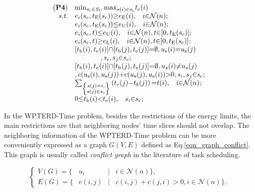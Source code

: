 \documentclass[journal,10pt]{IEEEtran}
\begin{document}
\begin{equation}
\label{eqn_wpterd_time}
\begin{array}{rl}
(\textbf{P4})&\mathop{\min}_{s_\text{c}{\in}S_\text{C}}{\max}_{s(i){\in}s_\text{c}}t_\text{e}(i)\\
\textit{s.t.}&e_i(s_\text{c},t_\text{E}(s_\text{c})){\geq}e_\text{E}(i),\hspace{3mm}i{\in}\mathcal{N}(n);\\
&e_i(s_\text{c},t_\text{E}(s_\text{c})){\leq}e_\text{U}(i),\hspace{3mm}i{\in}\mathcal{N}(n);\\
&e_i(s_\text{c},t){\leq}e_\text{U}(i),\hspace{3mm}i{\in}\mathcal{N}(n),t{\in}[0,t_\text{E}(s_\text{c})];\\
&e_i(s_\text{c},t){\geq}e_\text{L}(i),\hspace{3mm}i{\in}\mathcal{N}(n),t{\in}[0,t_\text{E}(s_\text{c})];\\
&[t_\text{b}(i),t_\text{e}(i)]{\cap}[t_\text{b}(j),t_\text{e}(j)]{=}\emptyset,u_\text{s}(i){=}u_\text{s}(j)\\
&\hspace{13mm},s_i,s_j{\in}s_c;\\
&[t_\text{b}(i),t_e(i)]{\cap}[t_\text{b}(j),t_e(j)]{=}\emptyset,u_s(i){\neq}u_s(j)\\
&,c(u_\text{s}(i),u_\text{s}(j)){+}c(u_\text{s}(j),u_\text{s}(i)){>}0,s_i,s_j{\in}s_\text{c};\\
&\sum_{\left\{\substack{s(j){=}i,\\s(j){\in}s_\text{c}}\right\}}\left(t_e(j){-}t_b(j)\right){=}t(i),\hspace{3mm}i{\in}\mathcal{N}(n);\\
&0{\leq}t_\text{b}(i){<}t_\text{e}(i),\hspace{3mm}s_i{\in}s_\text{c};
\end{array}
\end{equation}

In the WPTERD-Time problem, besides the restrictions of the energy limits, the main restrictions are that neighboring nodes' time slices should not overlap. The neighboring information of the WPTERD-Time problem can be more conveniently expressed as a graph $G(V,E)$ defined as Eq.\eqref{eqn_graph_conflict}. This graph is usually called \textit{conflict graph} in the literature of task scheduling.

\begin{equation}
\label{eqn_graph_conflict}
\left\{
\begin{array}{lcll}
V(G){=}\{&u_i&|&i{\in}\mathcal{N}(n)\},\\
E(G){=}\{&e(i,j)&|&c(i,j){+}c(j,i){>}0,i{\in}\mathcal{N}(n)\}.
\end{array}
\right.
\end{equation}
\end{document}
